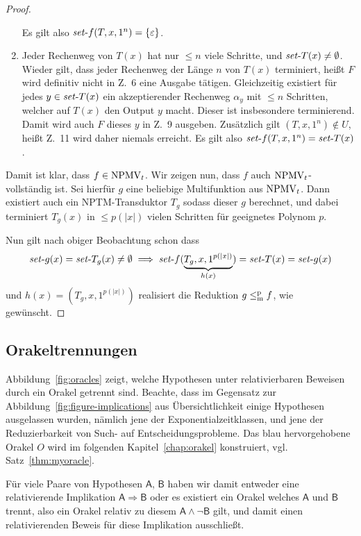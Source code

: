 \begin{proof}
\begin{enumerate}[label=\arabic*.]
            Es gilt also $\mathit{set}\text{-}{f}(T, x, 1^n)=\{\varepsilon\}$.
        \item Jeder Rechenweg von $T(x)$ hat nur $\leq n$ viele Schritte, und $\mathit{set}\text{-}{T}(x)\neq\emptyset$. 
            Wieder gilt, dass jeder Rechenweg der Länge $n$ von $T(x)$ terminiert, heißt $F$ wird definitiv nicht in Z.~6 eine Ausgabe tätigen.
            Gleichzeitig existiert für jedes $y\in \mathit{set}\text{-}{T}(x)$ ein akzeptierender Rechenweg $\alpha_y$ mit $\leq n$ Schritten, welcher auf $T(x)$ den Output $y$ macht. Dieser ist insbesondere terminierend. Damit wird auch $F$ dieses $y$ in Z.~9 ausgeben.
            Zusätzlich gilt $(T, x, 1^n)\not\in U$, heißt Z.~11 wird daher niemals erreicht.
            Es gilt also $\mathit{set}\text{-}{f}(T, x, 1^n)=\mathit{set}\text{-}{T}(x)$.
    \end{enumerate}

    Damit ist klar, dass $f\in\mathrm{NPMV}_t$.
    Wir zeigen nun, dass $f$ auch $\mathrm{NPMV}_t$-vollständig ist.
    Sei hierfür $g$ eine beliebige Multifunktion aus $\mathrm{NPMV}_t$.
    Dann existiert auch ein NPTM-Transduktor $T_g$ sodass dieser $g$ berechnet, und dabei terminiert $T_g(x)$ in $\leq p(|x|)$ vielen Schritten für geeignetes Polynom $p$.

    Nun gilt nach obiger Beobachtung schon dass 
    \[ \mathit{set}\text{-}{g}(x) = \mathit{set}\text{-}{T_g}(x)\neq\emptyset \implies \mathit{set}\text{-}{f}(\underbrace{T_g, x, 1^{p(|x|)}}_{h(x)})=\mathit{set}\text{-}{T}(x)=\mathit{set}\text{-}{g}(x) \]
    und $h(x)=(T_g, x, 1^{p(|x|)})$ realisiert die Reduktion $g\leq_\mathrm{m}^\mathrm{p} f$, wie gewünscht.
\end{proof}

\subsection*{Orakeltrennungen}


Abbildung~\ref{fig:oracles} zeigt, welche Hypothesen unter relativierbaren Beweisen durch ein Orakel getrennt sind.
Beachte, dass im Gegensatz zur Abbildung~\ref{fig:figure-implications} aus Übersichtlichkeit einige Hypothesen ausgelassen wurden, nämlich jene der Exponentialzeitklassen, und jene der Reduzierbarkeit von Such- auf Entscheidungsprobleme.
Das blau hervorgehobene Orakel $O$ wird im folgenden Kapitel~\ref{chap:orakel} konstruiert, vgl. Satz~\ref{thm:myoracle}.

Für viele Paare von Hypothesen $\mathsf{A}$, $\mathsf{B}$ haben wir damit entweder eine relativierende Implikation $\mathsf{A}\Rightarrow\mathsf{B}$ oder es existiert ein Orakel welches $\mathsf{A}$ und $\mathsf{B}$ trennt,  also ein Orakel relativ zu diesem $\mathsf{A}\land \neg\mathsf{B}$ gilt, und damit einen relativierenden Beweis für diese Implikation ausschließt. 

